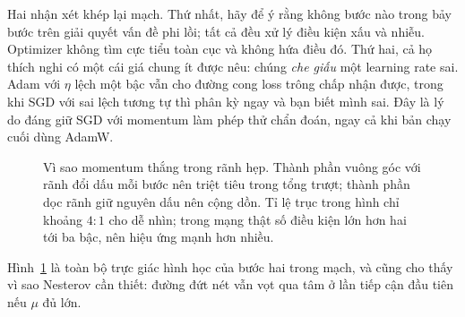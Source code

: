 \documentclass[../../../deep_learning.tex]{subfiles}
\begin{document}
Hai nhận xét khép lại mạch. Thứ nhất, hãy để ý rằng không bước nào trong bảy bước trên giải quyết vấn đề phi lồi; tất cả đều xử lý điều kiện xấu và nhiễu. Optimizer không tìm cực tiểu toàn cục và không hứa điều đó. Thứ hai, cả họ thích nghi có một cái giá chung ít được nêu: chúng \emph{che giấu} một learning rate sai. Adam với \(\eta\) lệch một bậc vẫn cho đường cong loss trông chấp nhận được, trong khi SGD với sai lệch tương tự thì phân kỳ ngay và bạn biết mình sai. Đây là lý do đáng giữ SGD với momentum làm phép thử chẩn đoán, ngay cả khi bản chạy cuối dùng AdamW.

\begin{figure}[H]\centering
{}
\caption{Vì sao momentum thắng trong rãnh hẹp. Thành phần vuông góc với rãnh đổi dấu mỗi bước nên triệt tiêu trong tổng trượt; thành phần dọc rãnh giữ nguyên dấu nên cộng dồn. Tỉ lệ trục trong hình chỉ khoảng \(4{:}1\) cho dễ nhìn; trong mạng thật số điều kiện lớn hơn hai tới ba bậc, nên hiệu ứng mạnh hơn nhiều.}
\label{fig:ranh-hep}
\end{figure}

Hình~\ref{fig:ranh-hep} là toàn bộ trực giác hình học của bước hai trong mạch, và cũng cho thấy vì sao Nesterov cần thiết: đường đứt nét vẫn vọt qua tâm ở lần tiếp cận đầu tiên nếu \(\mu\) đủ lớn.
\end{document}
